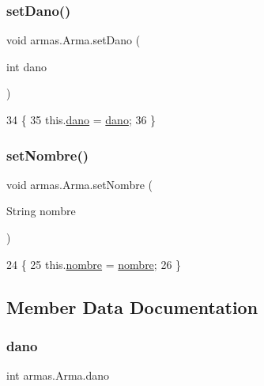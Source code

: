 \subsubsection{\texorpdfstring{set\+Dano()}{setDano()}}
{\footnotesize\ttfamily void armas.\+Arma.\+set\+Dano (\begin{DoxyParamCaption}\item[{int}]{dano }\end{DoxyParamCaption})\hspace{0.3cm}{\ttfamily [inline]}}


\begin{DoxyCode}
34     \{
35         this.\mbox{\hyperlink{classarmas_1_1_arma_a59396ee4b222360f19c8be08eb7d137b}{dano}} = \mbox{\hyperlink{classarmas_1_1_arma_a59396ee4b222360f19c8be08eb7d137b}{dano}};
36     \}
\end{DoxyCode}
\mbox{\label{classarmas_1_1_arma_a83ec9eab99a2e8856acebdc4aba25c11}} 
\subsubsection{\texorpdfstring{set\+Nombre()}{setNombre()}}
{\footnotesize\ttfamily void armas.\+Arma.\+set\+Nombre (\begin{DoxyParamCaption}\item[{String}]{nombre }\end{DoxyParamCaption})\hspace{0.3cm}{\ttfamily [inline]}}


\begin{DoxyCode}
24     \{
25         this.\mbox{\hyperlink{classarmas_1_1_arma_abdd717c561a99a3436dbfda8129b5581}{nombre}} = \mbox{\hyperlink{classarmas_1_1_arma_abdd717c561a99a3436dbfda8129b5581}{nombre}};
26     \}
\end{DoxyCode}


\subsection{Member Data Documentation}
\mbox{\label{classarmas_1_1_arma_a59396ee4b222360f19c8be08eb7d137b}} 
\subsubsection{\texorpdfstring{dano}{dano}}
{\footnotesize\ttfamily int armas.\+Arma.\+dano\hspace{0.3cm}{\ttfamily [private]}}

